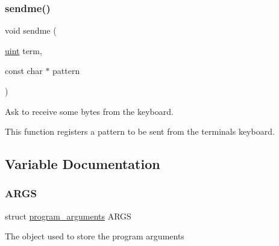 \subsubsection{\texorpdfstring{sendme()}{sendme()}}
{\footnotesize\ttfamily void sendme (\begin{DoxyParamCaption}\item[{\hyperlink{bios_8h_a91ad9478d81a7aaf2593e8d9c3d06a14}{uint}}]{term,  }\item[{const char $\ast$}]{pattern }\end{DoxyParamCaption})}



Ask to receive some bytes from the keyboard. 

This function registers a pattern to be sent from the terminal\textquotesingle{}s keyboard. 

\subsection{Variable Documentation}
\mbox{\label{group__Testing_ga0bc61f89e22f48a0af7de4659a69c6f2}} 
\subsubsection{\texorpdfstring{A\+R\+GS}{ARGS}}
{\footnotesize\ttfamily struct \hyperlink{structprogram__arguments}{program\+\_\+arguments}  A\+R\+GS}

The object used to store the program arguments 